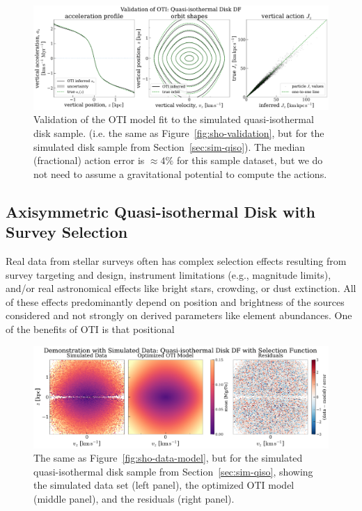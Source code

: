 \begin{figure}[t!]
\begin{center}
\includegraphics[width=\textwidth]{qiso-validation.pdf}
\end{center}
\caption{%
Validation of the OTI model fit to the simulated quasi-isothermal disk sample. (i.e. the
same as Figure~\ref{fig:sho-validation}, but for the simulated disk sample from
Section~\ref{sec:sim-qiso}).
The median (fractional) action error is $\approx 4\%$ for this sample dataset, but we do
not need to assume a gravitational potential to compute the actions.
\label{fig:qiso-validation}
}
\end{figure}

\subsection{Axisymmetric Quasi-isothermal Disk with Survey Selection}
\label{sec:sim-qiso-sel}

Real data from stellar surveys often has complex selection effects resulting from survey
targeting and design, instrument limitations (e.g., magnitude limits), and/or real
astronomical effects like bright stars, crowding, or dust extinction.
All of these effects predominantly depend on position and brightness of the sources
considered and not strongly on derived parameters like element abundances.
One of the benefits of OTI is that positional

\begin{figure}[t!]
\begin{center}
\includegraphics[width=\textwidth]{qiso-sel-data-model.pdf}
\end{center}
\caption{%
The same as Figure~\ref{fig:sho-data-model}, but for the simulated quasi-isothermal disk
sample from Section~\ref{sec:sim-qiso}, showing the simulated data set (left panel), the
optimized OTI model (middle panel), and the residuals (right panel).
\label{fig:qiso-sel-data-model}
}
\end{figure}


